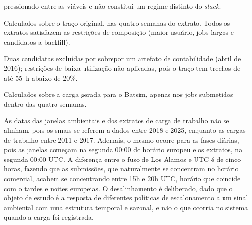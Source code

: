 \begin{table}[htb]
\begin{threeparttable}
\begin{tablenotes}
        pressionado entre as viáveis e não constitui um regime distinto do \textit{slack}.
      \item[b] Calculados sobre o traço original, nas quatro semanas do extrato. Todos os
        extratos satisfazem as restrições de composição (maior usuário, jobs largos e
        candidatos a backfill).
      \item[c] Duas candidatas excluídas por sobrepor um artefato de contabilidade
        (abril de 2016); restrições de baixa utilização não aplicadas, pois o traço tem
        trechos de até 55~h abaixo de 20\%.
      \item[d] Calculados sobre a carga gerada para o Batsim, apenas nos jobs submetidos
        dentro das quatro semanas.
    \end{tablenotes}
  \end{threeparttable}
\end{table}

As datas das janelas ambientais e dos extratos de carga de trabalho não se alinham, pois os sinais se referem a dados
entre 2018 e 2025, enquanto as cargas de trabalho entre 2011 e 2017. Ademais, o mesmo ocorre para as fases diárias, pois as janelas
começam na segunda 00:00 do horário europeu e os extratos, na segunda 00:00 UTC. A diferença entre o fuso de Los Alamos e UTC é de 
cinco horas, fazendo que as submissões, que naturalmente se concentram no horário comercial, acabem se concentrando entre 15h e 20h
UTC, horário que coincide com o tardes e noites europeias. O desalinhamento é deliberado, dado que 
o objeto de estudo é a resposta de diferentes políticas de escalonamento a um sinal ambiental com uma estrutura temporal
e sazonal, e não o que ocorria no sistema quando a carga foi registrada. 

